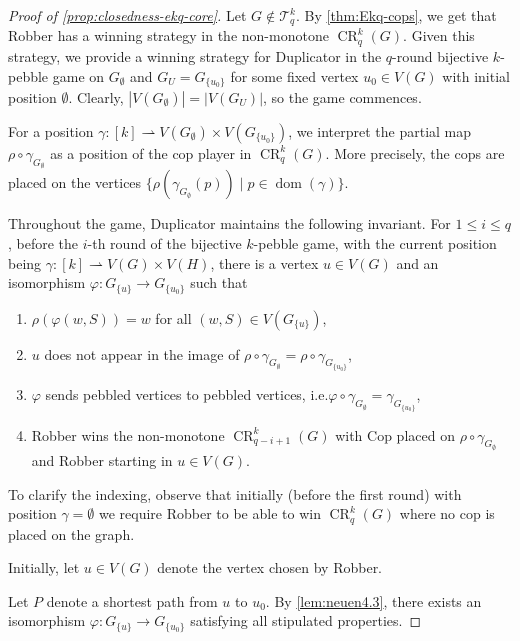 \documentclass{lmcs}
\theoremstyle{plain}\newtheorem{claim}[thm]{Claim}   %
\newcommand{\cT}{\ensuremath{\mathcal T}}
\DeclareMathOperator{\CR}{CR}
\DeclareMathOperator{\dom}{dom}
\newcommand{\Ekq}{\ensuremath{\cT_{q}^{k}}}
\renewcommand\phi\varphi
\begin{document}
\begin{proof}[Proof of \autoref{prop:closedness-ekq-core}]
	Let $G\notin\Ekq$.
	By \autoref{thm:Ekq-cops}, we get that Robber has a winning strategy in the non-monotone $\CR^k_q(G)$.
	Given this strategy, we provide a winning strategy for Duplicator in the $q$-round bijective $k$-pebble game on $G_\emptyset$ and $G_U = G_{\{u_0\}}$ for some fixed vertex $u_0 \in V(G)$ with initial position $\emptyset$.
	Clearly, $|V(G_\emptyset)| = |V(G_U)|$, so the game commences.
	
	For a position $\gamma \colon [k] \rightharpoonup V(G_\emptyset) \times V\left(G_{\{u_0\}}\right)$, we interpret the partial map $\rho \circ \gamma_{G_\emptyset}$ as a position of the cop player in $\CR^k_q(G)$.
	More precisely, the cops are placed on the vertices $\{\rho(\gamma_{G_\emptyset}(p)) \mid p \in \dom(\gamma)\}$.
	
	
	Throughout the game, Duplicator maintains the following invariant.
	For $1 \leq i \leq q$, before the $i$-th round of the bijective $k$-pebble game, with the current position being $\gamma \colon [k] \rightharpoonup V(G) \times V(H)$, there is a vertex $u \in V(G)$ and an isomorphism $\phi \colon G_{\{u\}} \to G_{\{u_0\}}$ such that
	\begin{enumerate}[label=(I.\arabic*), labelindent=0pt, itemindent=*, leftmargin=*]
		\item $\rho(\phi(w, S)) = w$ for all $(w, S) \in V(G_{\{u\}})$,\label{ax:inv1}
		\item $u$ does not appear in the image of $\rho \circ \gamma_{G_\emptyset} = \rho \circ \gamma_{G_{\{u_0\}}}$,\label{ax:inv2}
		\item $\phi$ sends pebbled vertices to pebbled vertices, i.e.\@ $\phi \circ \gamma_{G_\emptyset} = \gamma_{G_{\{u_0\}}}$,\label{ax:inv3}
		\item Robber wins the non-monotone $\CR^k_{q-i+1}(G)$ with Cop placed on $\rho \circ \gamma_{G_\emptyset}$ and Robber starting in $u \in V(G)$.\label{ax:inv4}
	\end{enumerate}
	
	To clarify the indexing, observe that initially (before the first round) with position $\gamma = \emptyset$ we require Robber to be able to win $\CR^k_q(G)$ where no cop is placed on the graph.
	
	Initially, let $u \in V(G)$ denote the vertex chosen by Robber.
	
	Let $P$ denote a shortest path from $u$ to $u_0$.
	By \autoref{lem:neuen4.3}, there exists an isomorphism $\phi \colon G_{\{u\}} \to G_{\{u_0\}}$ satisfying all stipulated properties.
	

\end{proof}
\end{document}
